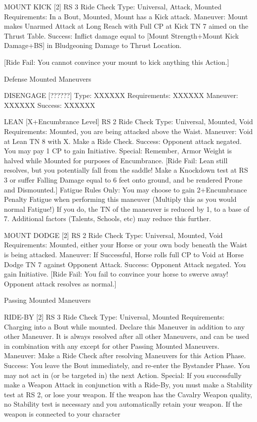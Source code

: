 \documentclass[oneside,11pt,english]{book}
\begin{document}
 

MOUNT KICK [2] {RS 3 Ride Check} 
Type: Universal, Attack, Mounted 
Requirements: In a Bout, Mounted, Mount has a Kick attack. 
Maneuver: Mount makes Unarmed Attack at Long Reach with Full CP at Kick TN 7 aimed on the Thrust 
Table. 
Success: Inflict damage equal to [Mount Strength+Mount Kick Damage+BS] in Bludgeoning Damage to 
Thrust Location. 


[Ride Fail: You cannot convince your mount to kick anything this Action.] 

 

 

Defense Mounted Maneuvers 

 

DISENGAGE [??????] 
Type: XXXXXX 
Requirements: XXXXXX 
Maneuver: XXXXXX 
Success: XXXXXX 

 

LEAN [X+Encumbrance Level] {RS 2 Ride Check} 
Type: Universal, Mounted, Void 
Requirements: Mounted, you are being attacked above the Waist. 
Maneuver: Void at Lean TN 8 with X. Make a Ride Check. 
Success: Opponent attack negated. You may pay 1 CP to gain Initiative. 
Special: Remember, Armor Weight is halved while Mounted for purposes of Encumbrance. 
[Ride Fail: Lean still resolves, but you potentially fall from the saddle! Make a Knockdown test at RS 3 
or suffer Falling Damage equal to 6 feet onto ground, and be rendered Prone and Dismounted.] 
Fatigue Rules Only: You may choose to gain 2+Encumbrance Penalty Fatigue when performing this 
maneuver (Multiply this as you would normal Fatigue!) If you do, the TN of the maneuver is reduced by 
1, to a base of 7. Additional factors (Talents, Schools, etc) may reduce this further. 

 

MOUNT DODGE [2] {RS 2 Ride Check} 
Type: Universal, Mounted, Void 
Requirements: Mounted, either your Horse or your own body beneath the Waist is being attacked. 
Maneuver: If Successful, Horse rolls full CP to Void at Horse Dodge TN 7 against Opponent Attack. 
Success: Opponent Attack negated. You gain Initiative. 
[Ride Fail: You fail to convince your horse to swerve away! Opponent attack resolves as normal.] 

 

 

Passing Mounted Maneuvers 

 

RIDE-BY [2] {RS 3 Ride Check} 
Type: Universal, Mounted 
Requirements: Charging into a Bout while mounted. Declare this Maneuver in addition to any other 
Maneuver. It is always resolved after all other Maneuvers, and can be used in combination with any 
except for other Passing Mounted Maneuvers. 
Maneuver: Make a Ride Check after resolving Maneuvers for this Action Phase. 
Success: You leave the Bout immediately, and re-enter the Bystander Phase. You may not act in (or be 
targeted in) the next Action. 
Special: If you successfully make a Weapon Attack in conjunction with a Ride-By, you must make a 
Stability test at RS 2, or lose your weapon. If the weapon has the Cavalry Weapon quality, no Stability 
test is necessary and you automatically retain your weapon. If the weapon is connected to your character 
\end{document}
